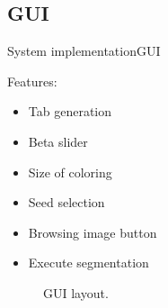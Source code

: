 \documentclass[10pt]{beamer}
\begin{document}
\subsection{GUI}
\begin{frame}{System implementation}{GUI}

\begin{minipage}{\textwidth}
  \begin{minipage}[b]{0.3\textwidth}
Features:
    \begin{itemize}
    \item Tab generation
    \item Beta slider
    \item Size of coloring
    \item Seed selection
    \item Browsing image button
    \item Execute segmentation
    \vspace{0.3in}
\end{itemize}
\end{minipage}
  \hfill
  \hfill
  \begin{minipage}[b]{0.6\textwidth}
 \begin{figure}
  \caption{GUI layout.}
  \end{figure}
\end{minipage}
  \end{minipage}

\end{frame}
\end{document}
